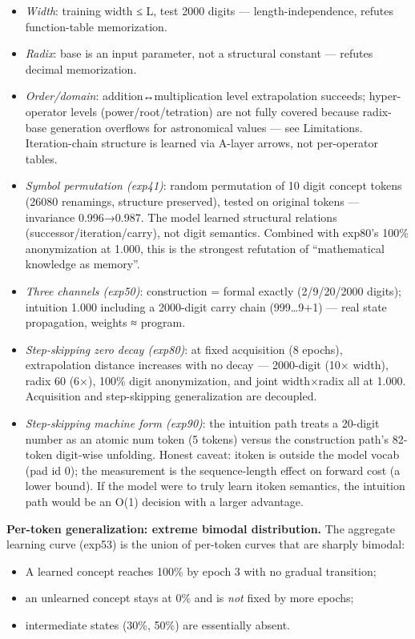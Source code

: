 \documentclass[
]{article}
\providecommand{\tightlist}{%
  \setlength{\itemsep}{0pt}\setlength{\parskip}{0pt}}
\begin{document}
\begin{itemize}
\tightlist
\item
  \emph{Width}: training width ≤ L, test 2000 digits ---
  length-independence, refutes function-table memorization.
\item
  \emph{Radix}: base is an input parameter, not a structural constant
  --- refutes decimal memorization.
\item
  \emph{Order/domain}: addition↔multiplication level extrapolation
  succeeds; hyper-operator levels (power/root/tetration) are not fully
  covered because radix-base generation overflows for astronomical
  values --- see Limitations. Iteration-chain structure is learned via
  A-layer arrows, not per-operator tables.
\item
  \emph{Symbol permutation (exp41)}: random permutation of 10 digit
  concept tokens (26080 renamings, structure preserved), tested on
  original tokens --- invariance 0.996→0.987. The model learned
  structural relations (successor/iteration/carry), not digit semantics.
  Combined with exp80's 100\% anonymization at 1.000, this is the
  strongest refutation of ``mathematical knowledge as memory''.
\item
  \emph{Three channels (exp50)}: construction = formal exactly
  (2/9/20/2000 digits); intuition 1.000 including a 2000-digit carry
  chain (999\ldots9+1) --- real state propagation, weights ≈ program.
\item
  \emph{Step-skipping zero decay (exp80)}: at fixed acquisition (8
  epochs), extrapolation distance increases with no decay --- 2000-digit
  (10× width), radix 60 (6×), 100\% digit anonymization, and joint
  width×radix all at 1.000. Acquisition and step-skipping generalization
  are decoupled.
\item
  \emph{Step-skipping machine form (exp90)}: the intuition path treats a
  20-digit number as an atomic num token (5 tokens) versus the
  construction path's 82-token digit-wise unfolding. Honest caveat:
  itoken is outside the model vocab (pad id 0); the measurement is the
  sequence-length effect on forward cost (a lower bound). If the model
  were to truly learn itoken semantics, the intuition path would be an
  O(1) decision with a larger advantage.
\end{itemize}

\textbf{Per-token generalization: extreme bimodal distribution.} The
aggregate learning curve (exp53) is the union of per-token curves that
are sharply bimodal:

\begin{itemize}
\tightlist
\item
  A learned concept reaches 100\% by epoch 3 with no gradual transition;
\item
  an unlearned concept stays at 0\% and is \emph{not} fixed by more
  epochs;
\item
  intermediate states (30\%, 50\%) are essentially absent.
\end{itemize}
\end{document}
